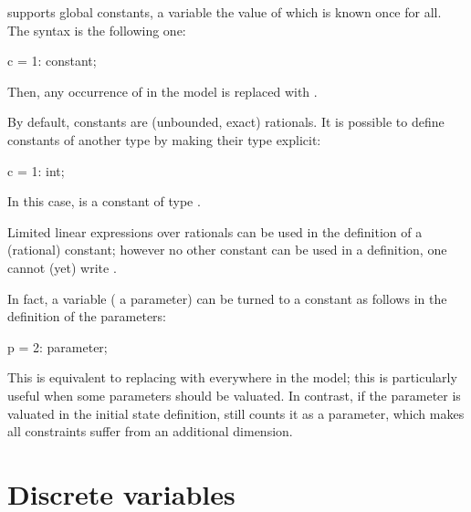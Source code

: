 \imitator{} supports global constants, \ie{} a variable the value of which is known once for all.
The syntax is the following one:

\begin{IMITATORmodel}
c = 1: constant;
\end{IMITATORmodel}

Then, any occurrence of  in the model is replaced with .

By default, constants are (unbounded, exact) rationals.
It is possible to define constants of another type by making their type explicit:

\begin{IMITATORmodel}
c = 1: int;
\end{IMITATORmodel}

In this case,  is a constant of type .

Limited linear expressions over rationals can be used in the definition of a (rational) constant; however no other constant can be used in a definition, \ie{} one cannot (yet) write .


\begin{hint}
	In fact, a variable (\eg{} a parameter) can be turned to a constant as follows in the definition of the parameters:

\begin{IMITATORmodel}
p = 2: parameter;
\end{IMITATORmodel}

	This is equivalent to replacing  with  everywhere in the model; this is particularly useful when some parameters should be valuated.
	In contrast, if the parameter is valuated in the initial state definition, \imitator{} still counts it as a parameter, which makes all constraints suffer from an additional dimension.
\end{hint}





\section{Discrete variables}\label{section:discrete}


